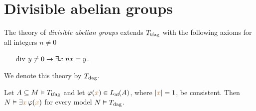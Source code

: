 \documentclass[creche.tex]{subfiles}
\begin{document}
% 
% 
% 



\section{Divisible abelian groups}

The theory of \emph{divisible abelian groups\/} extends $T_{\rm tfag}$ with the following axioms for all  integers $n\neq0$
\begin{itemize}
\item[div] $y\neq0\imp\E x\ nx=y$.
\end{itemize} 
We denote this theory by \emph{$T_{\rm dag}$}.

\begin{proposition}\label{prop_md_cons_sodd}
Let $A\subseteq M\models T_{\rm tfag}$ and let $\phi({\mr x})\in\atL(A)$, where $|{\mr x}|=1$, be consistent. Then $N\models\E {\mr x} \,\phi({\mr x})$ for every model $N\models T_{\rm dag}$.
\end{proposition}
\end{document}
